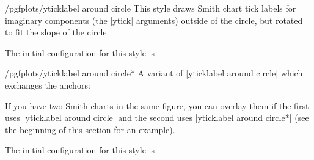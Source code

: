 \begin{stylekey}{/pgfplots/yticklabel around circle}
    This style draws Smith chart tick labels for imaginary components (the
    |ytick| arguments) outside of the circle, but rotated to fit the slope of
    the circle.
\begin{codeexample}[]
\end{codeexample}

    The initial configuration for this style is
\begin{codeexample}
\end{codeexample}
\end{stylekey}

\begin{stylekey}{/pgfplots/yticklabel around circle*}
    A variant of |yticklabel around circle| which exchanges the anchors:
\begin{codeexample}[]
\end{codeexample}
    If you have two Smith charts in the same figure, you can overlay them if
    the first uses |yticklabel around circle| and the second uses
    |yticklabel around circle*| (see the beginning of this section for an
    example).

    The initial configuration for this style is
\begin{codeexample}
\end{codeexample}
\end{stylekey}

